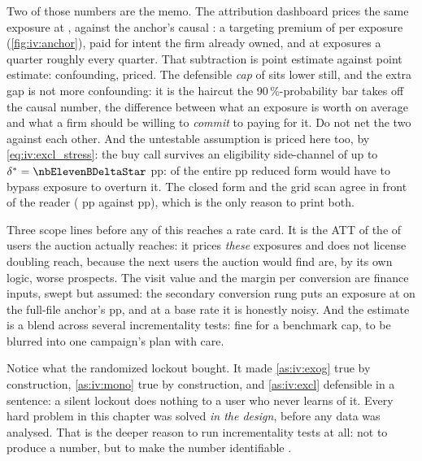 Two of those numbers are the memo. The attribution dashboard prices the same exposure at
\eur{\nbElevenBFullNaiveCap}, against the anchor's causal \eur{\nbElevenBAnchorCap}: a targeting
premium of \eur{\nbElevenBPremium} per exposure (\cref{fig:iv:anchor}), paid for intent the firm
already owned, and at \nbElevenBExposuresQuarter{} exposures a quarter roughly
\eur{\nbElevenBPremiumQuarter} every quarter. That subtraction is point estimate against point estimate: confounding, priced. The
defensible \emph{cap} of \eur{\nbElevenBCap} sits lower still, and the extra gap is not more
confounding: it is the haircut the 90\,\%-probability bar takes off the causal number, the difference
between what an exposure is worth on average and what a firm should be willing to \emph{commit} to
paying for it. Do not net the two against each other. And the untestable assumption is priced here
too, by
\cref{eq:iv:excl_stress}: the buy call survives an eligibility side-channel of up to
$\delta^{*} = \nbElevenBDeltaStar$ pp: \pc{\nbElevenBBreakDeltaPct} of the entire
\nbElevenBReduced{} pp reduced form would have to bypass exposure to overturn it. The closed form
and the grid scan agree in front of the reader (\nbElevenBDeltaStar{} pp against
\nbElevenBBreakDelta{} pp), which is the only reason to print both.

Three scope lines before any of this reaches a rate card. It is the ATT of the
\pc{\nbElevenBPExposedEligible} of users the auction actually reaches: it prices \emph{these}
exposures and does not license doubling reach, because the next users the auction would find are, by
its own logic, worse prospects. The \eur{\nbElevenBValuePerVisit} visit value and the
\eur{\nbElevenBConvMargin} margin per conversion are finance inputs, swept but assumed: the
secondary conversion rung puts an exposure at \eur{\nbElevenBConvValue} on the full-file anchor's
\nbElevenBAnchorConvWald{} pp, and at a \pc{\nbElevenBBaseConv} base rate it is honestly noisy.
And the estimate is a blend across several incrementality tests: fine for a benchmark cap, to be
blurred into one campaign's plan with care.

\begin{remark}
Notice what the randomized lockout bought. It made \cref{as:iv:exog} true by construction,
\cref{as:iv:mono} true by construction, and \cref{as:iv:excl} defensible in a sentence: a silent
lockout does nothing to a user who never learns of it. Every hard problem in this chapter was solved
\emph{in the design}, before any data was analysed. That is the deeper reason to run incrementality
tests at all: not to produce a number, but to make the number identifiable \citep{lewis2015,
gordon2019}.
\end{remark}

